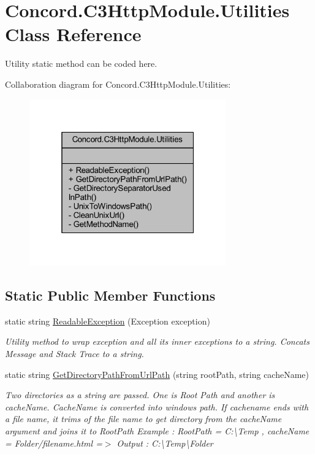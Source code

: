 \hypertarget{class_concord_1_1_c3_http_module_1_1_utilities}{}\section{Concord.\+C3\+Http\+Module.\+Utilities Class Reference}
\label{class_concord_1_1_c3_http_module_1_1_utilities}


Utility static method can be coded here.  




Collaboration diagram for Concord.\+C3\+Http\+Module.\+Utilities\+:
\nopagebreak
\begin{figure}[H]
\begin{center}
\leavevmode
\includegraphics[width=241pt]{class_concord_1_1_c3_http_module_1_1_utilities__coll__graph}
\end{center}
\end{figure}
\subsection*{Static Public Member Functions}
\begin{DoxyCompactItemize}
\item 
static string \mbox{\hyperlink{class_concord_1_1_c3_http_module_1_1_utilities_aadfb9271c63b98ed7754cfb8e07072e2}{Readable\+Exception}} (Exception exception)
\begin{DoxyCompactList}\small\item\em Utility method to wrap exception and all its inner exceptions to a string. Concats Message and Stack Trace to a string. \end{DoxyCompactList}\item 
static string \mbox{\hyperlink{class_concord_1_1_c3_http_module_1_1_utilities_a38d22d17b3554cf5064b7b4a9e5dbef0}{Get\+Directory\+Path\+From\+Url\+Path}} (string root\+Path, string cache\+Name)
\begin{DoxyCompactList}\small\item\em Two directories as a string are passed. One is Root Path and another is cache\+Name. Cache\+Name is converted into windows path. If cachename ends with a file name, it trims of the file name to get directory from the cache\+Name argument and joins it to Root\+Path Example \+: Root\+Path = C\+:\textbackslash{}\+Temp , cache\+Name = Folder/filename.\+html =$>$ Output \+: C\+:\textbackslash{}\+Temp\textbackslash{}\+Folder \end{DoxyCompactList}\end{DoxyCompactItemize}
